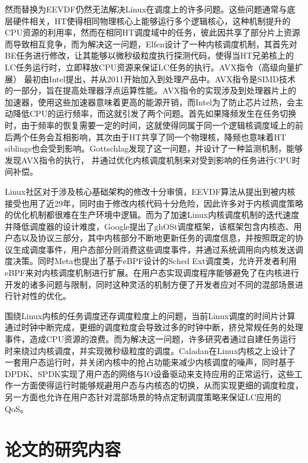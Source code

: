 然而替换为EEVDF仍然无法解决Linux在调度上的许多问题。这些问题通常与底层硬件相关，HT使得相同物理核心上能够运行多个逻辑核心，这种机制提升的CPU资源的利用率，然而在相同HT调度域中的任务，彼此因共享了部分片上资源而导致相互竞争，而为解决这一问题，Elfen\citep{yang2016elfen}设计了一种内核调度机制，其首先对BE任务进行修改，让其能够以微秒级粒度执行探测代码，使得当HT兄弟核上的LC任务运行时，立即释放CPU资源来保证LC任务的执行。AVX指令（高级向量扩展）\citep{guide2011intel} 最初由Intel提出，并从2011开始加入到处理产品中。AVX指令是SIMD技术的一部分，旨在提高处理器浮点运算性能。AVX指令的实现涉及到处理器片上的加速器，使用这些加速器意味着更高的能源开销，而Intel为了防止芯片过热，会主动降低CPU的运行频率，而这就引发了两个问题。首先如果降频发生在任务切换时，由于频率的恢复需要一定的时间，这就使得同属于同一个逻辑核调度域上的前后两个任务会互相影响，其次由于HT共享了同一个物理核，降频也意味着HT siblings也会受到影响。Gottschlag\citep{gottschlag2020avx}发现了这一问题，并设计了一种监测机制，能够发现AVX指令的执行， 并通过优化内核调度机制来对受到影响的任务进行CPU时间补偿。

Linux社区对于涉及核心基础架构的修改十分审慎，EEVDF算法从提出到被内核接受也用了近29年，同时由于修改内核代码十分危险，因此许多对于内核调度策略的优化机制都很难在生产环境中逻辑。而为了加速Linux内核调度机制的迭代速度并降低调度器的设计难度，Google提出了ghOSt\citep{humphries2021ghost}调度框架，该框架包含内核态、用户态以及协议三部分，其中内核部分不断地更新任务的调度信息，并按照既定的协议生成调度事件，用户态部分则消费这些调度事件，并通过系统调用向内核发送调度决策。同时Meta也提出了基于eBPF设计的Sched Ext调度类，允许开发者利用eBPF来对内核调度机制进行扩展。在用户态实现调度程序能够避免了在内核进行开发的诸多问题与限制，同时这种灵活的机制方便了开发者应对不同的混部场景进行针对性的优化。

围绕Linux内核的任务调度还存调度粒度上的问题，当前Linux调度的时间片计算通过时钟中断完成，更细的调度粒度会导致过多的时钟中断，挤兑常规任务的处理事件，造成CPU资源的浪费。而为解决这一问题，许多研究者通过自建任务运行时来绕过内核调度，并实现微秒级粒度的调度\citep{yang2016elfen,ousterhout2019shenango,fried2020caladan,prekas2017zygos}。Caladan\citep{fried2020caladan}在Linux内核之上设计了一套用户态运行时，并关闭内核中的抢占功能来减少内核调度的噪声，同时基于DPDK、SPDK实现了用户态的网络与IO设备驱动来支持应用的正常运行，这些工作一方面使得运行时能够规避用户态与内核态的切换，从而实现更细的调度粒度，另一方面也允许在用户态针对混部场景的特点定制调度策略来保证LC应用的QoS。

\section{论文的研究内容}

